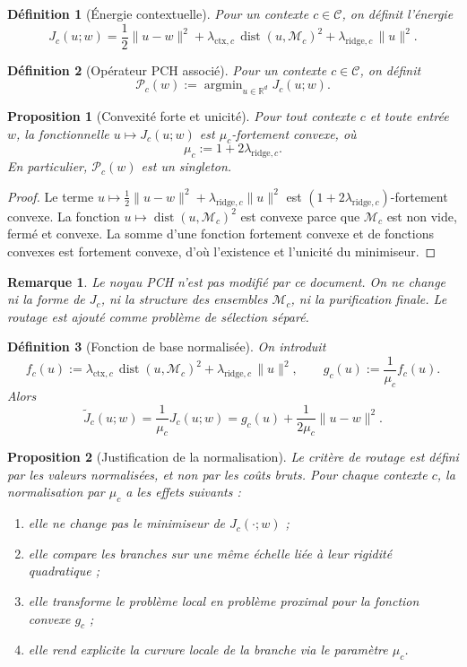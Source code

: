\documentclass[11pt,a4paper]{article}
\newtheorem{definition}{Définition}[section]
\newtheorem{proposition}{Proposition}[section]
\newtheorem{remark}{Remarque}[section]
\DeclareMathOperator{\argmin}{argmin}
\DeclareMathOperator{\dist}{dist}
\newcommand{\R}{\mathbb R}
\newcommand{\Mcal}{\mathcal M}
\newcommand{\Ccal}{\mathcal C}
\newcommand{\Pcal}{\mathcal P}
\begin{document}
\begin{definition}[Énergie contextuelle]
Pour un contexte \(c\in\Ccal\), on définit l'énergie
\[
J_c(u;w)=\frac12\|u-w\|^2+\lambda_{\mathrm{ctx},c}\,\dist(u,\Mcal_c)^2+\lambda_{\mathrm{ridge},c}\,\|u\|^2.
\]
\end{definition}

\begin{definition}[Opérateur PCH associé]
Pour un contexte \(c\in\Ccal\), on définit
\[
\Pcal_c(w):=\argmin_{u\in\R^d} J_c(u;w).
\]
\end{definition}

\begin{proposition}[Convexité forte et unicité]
Pour tout contexte \(c\) et toute entrée \(w\), la fonctionnelle \(u\mapsto J_c(u;w)\) est \(\mu_c\)-fortement convexe, où
\[
\mu_c:=1+2\lambda_{\mathrm{ridge},c}.
\]
En particulier, \(\Pcal_c(w)\) est un singleton.
\end{proposition}

\begin{proof}
Le terme \(u\mapsto \frac12\|u-w\|^2+\lambda_{\mathrm{ridge},c}\|u\|^2\) est \((1+2\lambda_{\mathrm{ridge},c})\)-fortement convexe. La fonction \(u\mapsto \dist(u,\Mcal_c)^2\) est convexe parce que \(\Mcal_c\) est non vide, fermé et convexe. La somme d'une fonction fortement convexe et de fonctions convexes est fortement convexe, d'où l'existence et l'unicité du minimiseur.
\end{proof}

\begin{remark}
Le noyau PCH n'est pas modifié par ce document. On ne change ni la forme de \(J_c\), ni la structure des ensembles \(\Mcal_c\), ni la purification finale. Le routage est ajouté comme problème de sélection séparé.
\end{remark}

\begin{definition}[Fonction de base normalisée]
On introduit
\[
f_c(u):=\lambda_{\mathrm{ctx},c}\,\dist(u,\Mcal_c)^2+\lambda_{\mathrm{ridge},c}\,\|u\|^2,
\qquad
g_c(u):=\frac{1}{\mu_c}f_c(u).
\]
Alors
\[
\widetilde J_c(u;w)=\frac{1}{\mu_c}J_c(u;w)
=
g_c(u)+\frac{1}{2\mu_c}\|u-w\|^2.
\]
\end{definition}

\begin{proposition}[Justification de la normalisation]
Le critère de routage est défini par les valeurs normalisées, et non par les coûts bruts. Pour chaque contexte \(c\), la normalisation par \(\mu_c\) a les effets suivants :
\begin{enumerate}[leftmargin=2em]
\item elle ne change pas le minimiseur de \(J_c(\cdot;w)\) ;
\item elle compare les branches sur une même échelle liée à leur rigidité quadratique ;
\item elle transforme le problème local en problème proximal pour la fonction convexe \(g_c\) ;
\item elle rend explicite la curvure locale de la branche via le paramètre \(\mu_c\).
\end{enumerate}
\end{proposition}
\end{document}
